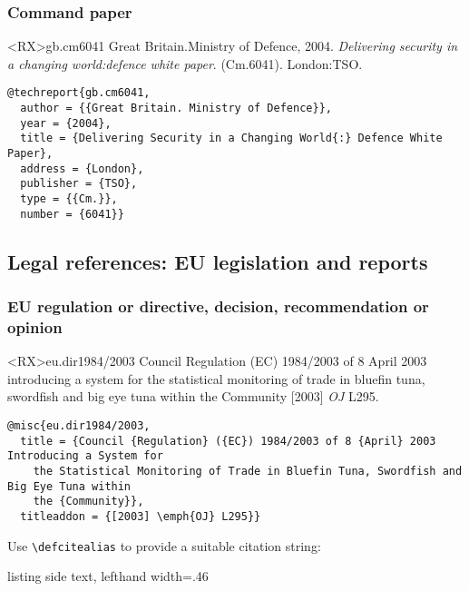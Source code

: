 \documentclass[10pt,a4paper]{article}
\newenvironment{hacks}{%
  \begin{list}{\makebox[2em][c]{\faWrench}}{%
    \setlength{\leftmargin}{2em}
    \setlength{\labelwidth}{2em}
    \setlength{\labelsep}{0pt}}
}{\end{list}}
\begin{document}
\subsubsection*{Command paper}

\begin{bibexbox}<RX>{gb.cm6041}
  Great Britain.\@ Ministry of Defence, 2004. \emph{Delivering security in a changing world:\@ defence white paper}. (Cm.\@ 6041). London:\@ TSO.
  \tcblower
\begin{Verbatim}
@techreport{gb.cm6041,
  author = {{Great Britain. Ministry of Defence}},
  year = {2004},
  title = {Delivering Security in a Changing World{:} Defence White Paper},
  address = {London},
  publisher = {TSO},
  type = {{Cm.}},
  number = {6041}}
\end{Verbatim}
\end{bibexbox}

\subsection{Legal references: EU legislation and reports}


\subsubsection*{EU regulation or directive, decision, recommendation or opinion}

\begin{bibexbox}<RX>{eu.dir1984/2003}
  Council Regulation (EC) 1984/2003 of 8 April 2003 introducing a system for the statistical monitoring of trade in bluefin tuna, swordfish and big eye tuna within the Community [2003] \emph{OJ} L295.
  \tcblower
\begin{Verbatim}
@misc{eu.dir1984/2003,
  title = {Council {Regulation} ({EC}) 1984/2003 of 8 {April} 2003 Introducing a System for
    the Statistical Monitoring of Trade in Bluefin Tuna, Swordfish and Big Eye Tuna within
    the {Community}},
  titleaddon = {[2003] \emph{OJ} L295}}
\end{Verbatim}
\end{bibexbox}

\begin{hacks}
\item Use \lstinline[style=dtxlatex]|\defcitealias| to provide a suitable citation string:
\begin{tcblisting}{listing side text, lefthand width=.46\linewidth}
\end{tcblisting}
\end{hacks}
\end{document}
